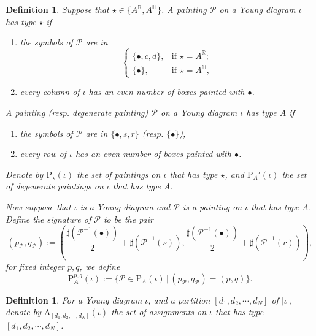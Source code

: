 \documentclass[12pt, a4paper]{amsart}
\numberwithin{equation}{section}
\newtheorem{defn}[thm]{Definition}
\newcommand{\BH}{{\mathbb {H}}}
\newcommand{\BR}{{\mathbb {R}}}
\newcommand{\CP}{{\mathcal {P}}}
\newcommand{\RA}{{\mathrm {A}}}
\newcommand{\set}[2]{\{#1\,|\,#2\}}
\begin{document}
\begin{defn}
   Suppose that $\star \in \{A^{\BR}, A^{\BH}\}$. A painting $\CP$ on a Young diagram $\iota$ has type $\star$ if
   \begin{enumerate}
      \item the symbols of $\CP$ are in
            $$\left\{
               \begin{array}{lr}
                  \{\bullet,c,d\}, & \textrm{if $\star = A^{\BR}$};\\                   
                  \{\bullet\},     & \textrm{if $\star = A^{\BH}$},
               \end{array}
               \right.
            $$
      \item every column of $\iota$ has an even number of boxes painted with $\bullet$.
   \end{enumerate}

   A painting (resp. degenerate painting) $\CP$ on a Young diagram $\iota$ has type $A$ if
   \begin{enumerate}
      \item the symbols of $\CP$ are in $\{\bullet, s ,r\}$ (resp. $\{\bullet\}$),
      \item every row of $\iota$ has an even number of boxes painted with $\bullet$.
   \end{enumerate}

   Denote by $\mathrm{P}_{\star}(\iota)$ the set of paintings on $\iota$ that has type $\star$, and $\mathrm{P}_{A}'(\iota)$ the set of degenerate paintings on $\iota$ that has type $A$.

   Now suppose that $\iota$ is a Young diagram and $\CP$ is a painting on $\iota$ that has type $A$. Define the signature of $\CP$ to be the pair 
   \begin{equation}
    (p_{\CP}, q_{\CP}) := (\frac{\sharp(\CP^{-1}(\bullet))}{2} + \sharp(\CP^{-1}(s)), \frac{\sharp(\CP^{-1}(\bullet))}{2}+ \sharp(\CP^{-1}(r))),
   \end{equation}
   for fixed integer $p,q$, we define
   \begin{equation}
        \mathrm{P}_{A}^{p,q}(\iota) := \set{\CP \in \mathrm{P}_{A}(\iota)}{(p_{\CP},q_{\CP}) = (p,q)}.       
   \end{equation}
\end{defn}

\begin{defn}
   For a Young diagram $\iota$, and a partition $[d_1,d_2,\cdots,d_N]$ of $|\iota|$, denote by $\RA_{[d_1,d_2,\cdots,d_N]}(\iota)$ the set of assignments on $\iota$ that has type $[d_1,d_2,\cdots,d_N]$.
\end{defn}
\end{document}

